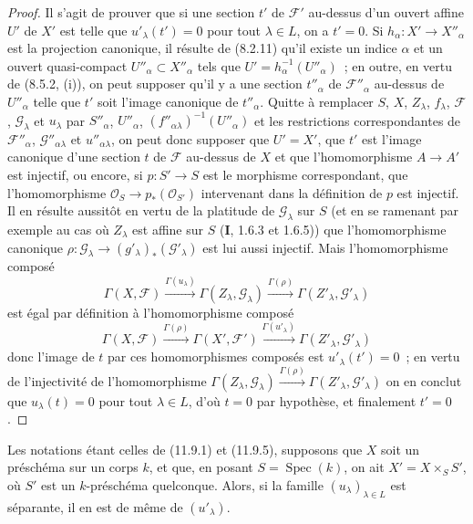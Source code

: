 \begin{proof}
Il s'agit de prouver que si une section $t'$ de $\mathcal F'$ au-dessus d'un
ouvert affine $U'$ de $X'$ est telle que $u'_\lambda(t')=0$ pour tout
$\lambda\in L$, on a $t'=0$. Si $h_\alpha:X'\to X''_\alpha$ est la projection
canonique, il résulte de (8.2.11) qu'il existe un indice $\alpha$ et un ouvert
quasi-compact $U''_\alpha\subset X''_\alpha$ tels que
$U'=h_\alpha^{-1}(U''_\alpha)$~; en outre, en vertu de (8.5.2, (i)), on peut
supposer qu'il y a une section $t''_\alpha$ de $\mathcal F''_\alpha$ au-dessus
de $U''_\alpha$ telle que $t'$ soit l'image canonique de $t''_\alpha$. Quitte à
remplacer $S$, $X$, $Z_\lambda$, $f_\lambda$, $\mathcal F$,
$\mathcal G_\lambda$ et $u_\lambda$ par $S''_\alpha$, $U''_\alpha$,
$(f''_{\alpha\lambda})^{-1}(U''_\alpha)$ et les restrictions correspondantes
de $\mathcal F''_\alpha$, $\mathcal G''_{\alpha\lambda}$ et
$u''_{\alpha\lambda}$, on peut donc supposer que $U'=X'$, que $t'$ est
l'image canonique d'une section $t$ de $\mathcal F$ au-dessus de $X$ et que
l'homomorphisme $A\to A'$ est injectif, ou encore, si $p:S'\to S$ est le
morphisme correspondant, que l'homomorphisme
$\mathcal O_S\to p_*(\mathcal O_{S'})$ intervenant dans la définition de $p$
est injectif. Il en résulte aussitôt en vertu de la platitude de
$\mathcal G_\lambda$ sur $S$ (et en se ramenant par exemple au cas où
$Z_\lambda$ est affine sur $S$ (\textbf I, 1.6.3 et 1.6.5)) que
l'homomorphisme canonique
$\rho:\mathcal G_\lambda\to(g'_\lambda)_*(\mathcal G'_\lambda)$ est lui aussi
injectif. Mais l'homomorphisme composé
\[
\Gamma(X,\mathcal F)\xrightarrow{\Gamma(u_\lambda)}
\Gamma(Z_\lambda,\mathcal G_\lambda)\xrightarrow{\Gamma(\rho)}
\Gamma(Z'_\lambda,\mathcal G'_\lambda)
\]
est égal par définition à l'homomorphisme composé
\[
\Gamma(X,\mathcal F)\xrightarrow{\Gamma(\rho)}
\Gamma(X',\mathcal F')\xrightarrow{\Gamma(u'_\lambda)}
\Gamma(Z'_\lambda,\mathcal G'_\lambda)
\]
donc l'image de $t$ par ces homomorphismes composés est
$u'_\lambda(t')=0$~; en vertu de l'injectivité de l'homomorphisme
$\Gamma(Z_\lambda,\mathcal G_\lambda)\xrightarrow{\Gamma(\rho)}
\Gamma(Z'_\lambda,\mathcal G'_\lambda)$ on en conclut que $u_\lambda(t)=0$
pour tout $\lambda\in L$, d'où $t=0$ par hypothèse, et finalement $t'=0$.
\end{proof}

\begin{proposition}[11.9.13]
\label{IV.11.9.13-fr}
Les notations étant celles de (11.9.1) et (11.9.5), supposons que $X$ soit un
préschéma sur un corps $k$, et que, en posant $S=\operatorname{Spec}(k)$, on
ait $X'=X\times_S S'$, où $S'$ est un $k$-préschéma quelconque. Alors, si la
famille $(u_\lambda)_{\lambda\in L}$ est séparante, il en est de même de
$(u'_\lambda)$.
\end{proposition}

